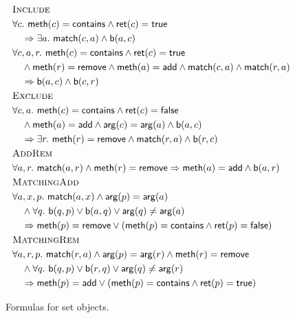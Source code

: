 \begin{figure}
  \footnotesize
  \begin{align*}
    & \textsc{Include} \\
    & \forall c.\ {\sf meth}(c) = {\sf contains} \land {\sf ret}(c) = {\sf true} \\
    & \quad \implies \exists a.\ {\sf match}(c,a) \land {\sf b}(a,c) \\
    & \forall c,a,r.\ {\sf meth}(c)={\sf contains} \land {\sf ret}(c) = {\sf true} \\
    & \quad \land {\sf meth}(r) = {\sf remove}\land {\sf meth}(a) = {\sf add} \land  {\sf match}(c,a) \land {\sf match}(r,a)  \\ %
    & \quad \implies {\sf b}(a,c) \land {\sf b}(c,r)
    \\
    & \textsc{Exclude} \\
    & \forall c,a.\ {\sf meth}(c)={\sf contains} \land {\sf ret}(c) = {\sf false} \\
    & \quad \land {\sf meth}(a) = {\sf add}\land {\sf arg}(c) = {\sf arg}(a) \land {\sf b}(a,c) \\
    & \quad \implies \exists r.\ {\sf meth}(r)={\sf remove} \land {\sf match}(r,a) \land {\sf b}(r,c)
    \\
    & \textsc{AddRem} \\
    & \forall a,r.\ {\sf match}(a,r) \land {\sf meth}(r) = {\sf remove}  \implies {\sf meth}(a)={\sf add} \land {\sf b}(a,r) 
    \\
    & \textsc{MatchingAdd} \\
    & \forall a,x,p.\ {\sf match}(a,x) \land {\sf arg}(p) = {\sf arg}(a) \\
    & \quad \land \forall q.\ {\sf b}(q,p) \vee {\sf b}(a,q) \vee {\sf arg}(q)\neq {\sf arg}(a) \\
    & \quad \implies {\sf meth}(p)={\sf remove} \vee ({\sf meth}(p)={\sf contains} \land {\sf ret}(p) = {\sf false}) 
    \\
    & \textsc{MatchingRem} \\
    & \forall a,r,p.\ {\sf match}(r,a) \land {\sf arg}(p) = {\sf arg}(r) \land {\sf meth}(r)={\sf remove}\\
    & \quad \land \forall q.\ {\sf b}(q,p) \vee {\sf b}(r,q) \vee {\sf arg}(q)\neq {\sf arg}(r) \\
    & \quad \implies {\sf meth}(p)={\sf add} \vee ({\sf meth}(p)={\sf contains} \land {\sf ret}(p) = {\sf true}) 
  \end{align*}
  \caption{Formulas for set objects.}
  \label{fig:formulas:set}
\end{figure}

